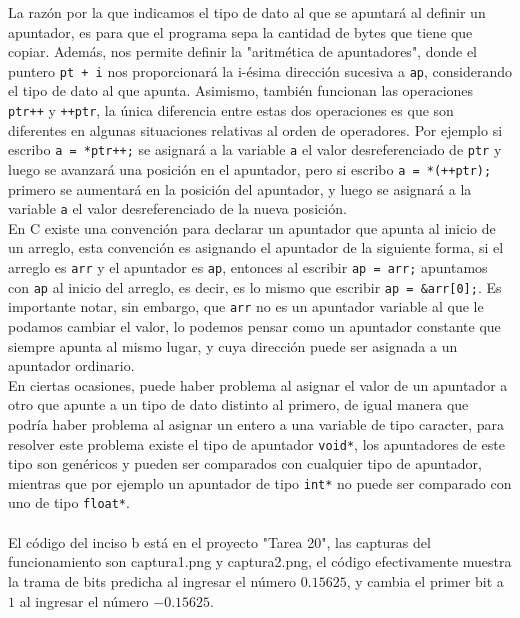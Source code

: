 \documentclass[12pt]{article}
\begin{document}
La razón por la que indicamos el tipo de dato al que se apuntará al definir un apuntador, es para que el programa sepa la cantidad de bytes que tiene que copiar. Además, nos permite definir la "aritmética de apuntadores", donde el puntero \texttt{pt + i} nos proporcionará la i-ésima dirección sucesiva a \texttt{ap}, considerando el tipo de dato al que apunta. Asimismo, también funcionan las operaciones \texttt{ptr++} y \texttt{++ptr}, la única diferencia entre estas dos operaciones es que son diferentes en algunas situaciones relativas al orden de operadores. Por ejemplo si escribo \texttt{a = *ptr++;} se asignará a la variable \texttt{a} el valor desreferenciado de \texttt{ptr} y luego se avanzará una posición en el apuntador, pero si escribo \texttt{a = *(++ptr);} primero se aumentará en la posición del apuntador, y luego se asignará a la variable \texttt{a} el valor desreferenciado de la nueva posición.\\

En C existe una convención para declarar un apuntador que apunta al inicio de un arreglo, esta convención es asignando el apuntador de la siguiente forma, si el arreglo es \texttt{arr} y el apuntador es \texttt{ap}, entonces al escribir \texttt{ap = arr;} apuntamos con \texttt{ap} al inicio del arreglo, es decir, es lo mismo que escribir \texttt{ap = \&arr[0];}. Es importante notar, sin embargo, que \texttt{arr} no es un apuntador variable al que le podamos cambiar el valor, lo podemos pensar como un apuntador constante que siempre apunta al mismo lugar, y cuya dirección puede ser asignada a un apuntador ordinario.\\

En ciertas ocasiones, puede haber problema al asignar el valor de un apuntador a otro que apunte a un tipo de dato distinto al primero, de igual manera que podría haber problema al asignar un entero a una variable de tipo caracter, para resolver este problema existe el tipo de apuntador \texttt{void*}, los apuntadores de este tipo son genéricos y pueden ser comparados con cualquier tipo de apuntador, mientras que por ejemplo un apuntador de tipo \texttt{int*} no puede ser comparado con uno de tipo \texttt{float*}.\\\\

El código del inciso b está en el proyecto "Tarea 20", las capturas del funcionamiento son captura1.png y captura2.png, el código efectivamente muestra la trama de bits predicha al ingresar el número $0.15625$, y cambia el primer bit a $1$ al ingresar el número $-0.15625$. 
\end{document}
